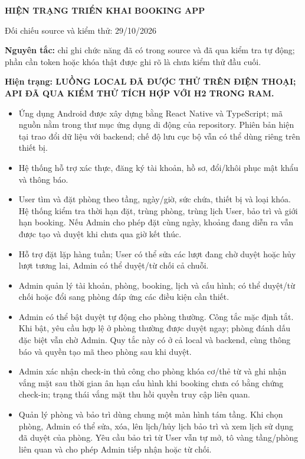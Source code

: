 \documentclass[12pt,a4paper]{article}
\begin{document}
\begin{center}
  {\LARGE\bfseries\color{hustred} HIỆN TRẠNG TRIỂN KHAI BOOKING APP}\par
  \vspace{0.1cm}
  {\small Đối chiếu source và kiểm thử: 29/10/2026}
\end{center}

\textbf{Nguyên tắc:} chỉ ghi chức năng đã có trong source và đã qua kiểm tra tự động; phần cần token hoặc khóa thật được ghi rõ là chưa kiểm thử đầu cuối.

\textbf{Hiện trạng: LUỒNG LOCAL ĐÃ ĐƯỢC THỬ TRÊN ĐIỆN THOẠI; API ĐÃ QUA KIỂM THỬ TÍCH HỢP VỚI H2 TRONG RAM.}

\begin{itemize}[leftmargin=1.6em,itemsep=2pt,topsep=2pt]
  \item Ứng dụng Android được xây dựng bằng React Native và TypeScript; mã nguồn nằm trong thư mục ứng dụng di động của repository. Phiên bản hiện tại trao đổi dữ liệu với backend; chế độ lưu cục bộ vẫn có thể dùng riêng trên thiết bị.
  \item Hệ thống hỗ trợ xác thực, đăng ký tài khoản, hồ sơ, đổi/khôi phục mật khẩu và thông báo.
  \item User tìm và đặt phòng theo tầng, ngày/giờ, sức chứa, thiết bị và loại khóa. Hệ thống kiểm tra thời hạn đặt, trùng phòng, trùng lịch User, bảo trì và giới hạn booking. Nếu Admin cho phép đặt cùng ngày, khoảng đang diễn ra vẫn được tạo và duyệt khi chưa qua giờ kết thúc.
  \item Hỗ trợ đặt lặp hàng tuần; User có thể sửa các lượt đang chờ duyệt hoặc hủy lượt tương lai, Admin có thể duyệt/từ chối cả chuỗi.
  \item Admin quản lý tài khoản, phòng, booking, lịch và cấu hình; có thể duyệt/từ chối hoặc đổi sang phòng đáp ứng các điều kiện cần thiết.
  \item Admin có thể bật duyệt tự động cho phòng thường. Công tắc mặc định tắt. Khi bật, yêu cầu hợp lệ ở phòng thường được duyệt ngay; phòng đánh dấu đặc biệt vẫn chờ Admin. Quy tắc này có ở cả local và backend, cùng thông báo và quyền tạo mã theo phòng sau khi duyệt.
  \item Admin xác nhận check-in thủ công cho phòng khóa cơ/thẻ từ và ghi nhận vắng mặt sau thời gian ân hạn cấu hình khi booking chưa có bằng chứng check-in; trạng thái vắng mặt thu hồi quyền truy cập liên quan.
  \item Quản lý phòng và bảo trì dùng chung một màn hình tám tầng. Khi chọn phòng, Admin có thể sửa, xóa, lên lịch/hủy lịch bảo trì và xem lịch sử dụng đã duyệt của phòng. Yêu cầu bảo trì từ User vẫn tự mở, tô vàng tầng/phòng liên quan và cho phép Admin tiếp nhận hoặc từ chối.

\end{itemize}
\end{document}
